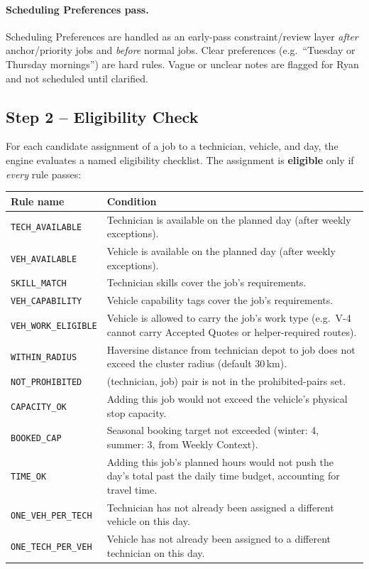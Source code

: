 \documentclass[12pt]{article}
\begin{document}
\paragraph{Scheduling Preferences pass.}
Scheduling Preferences are handled as an early-pass constraint/review layer \emph{after} anchor/priority jobs and \emph{before} normal jobs.
Clear preferences (e.g.\ ``Tuesday or Thursday mornings'') are hard rules.
Vague or unclear notes are flagged for Ryan and not scheduled until clarified.

\subsection*{Step 2 -- Eligibility Check}

For each candidate assignment of a job to a technician, vehicle, and day, the engine evaluates a named eligibility checklist.
The assignment is \textbf{eligible} only if \emph{every} rule passes:

\medskip
{\small
\begin{longtable}{lp{9.5cm}}
\toprule
\textbf{Rule name} & \textbf{Condition} \\
\midrule
\texttt{TECH\_AVAILABLE}     & Technician is available on the planned day (after weekly exceptions). \\
\texttt{VEH\_AVAILABLE}      & Vehicle is available on the planned day (after weekly exceptions). \\
\texttt{SKILL\_MATCH}        & Technician skills cover the job's requirements. \\
\texttt{VEH\_CAPABILITY}     & Vehicle capability tags cover the job's requirements. \\
\texttt{VEH\_WORK\_ELIGIBLE} & Vehicle is allowed to carry the job's work type (e.g.\ V-4 cannot carry Accepted Quotes or helper-required routes). \\
\texttt{WITHIN\_RADIUS}      & Haversine distance from technician depot to job does not exceed the cluster radius (default 30\,km). \\
\texttt{NOT\_PROHIBITED}     & (technician, job) pair is not in the prohibited-pairs set. \\
\texttt{CAPACITY\_OK}        & Adding this job would not exceed the vehicle's physical stop capacity. \\
\texttt{BOOKED\_CAP}         & Seasonal booking target not exceeded (winter: 4, summer: 3, from Weekly Context). \\
\texttt{TIME\_OK}            & Adding this job's planned hours would not push the day's total past the daily time budget, accounting for travel time. \\
\texttt{ONE\_VEH\_PER\_TECH} & Technician has not already been assigned a different vehicle on this day. \\
\texttt{ONE\_TECH\_PER\_VEH} & Vehicle has not already been assigned to a different technician on this day. \\
\bottomrule
\end{longtable}
}
\end{document}
